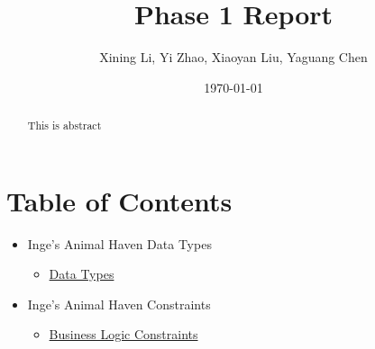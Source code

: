 \documentclass[a4paper]{article}
\begin{document}
\title{\textbf{\huge{Phase 1 Report}}}
\author{\textbf\large{Xining Li, Yi Zhao, Xiaoyan Liu, Yaguang Chen}}
\date{\today}
\maketitle
\begin{abstract}
This is abstract
\end{abstract}\maketitle
\section{Table of Contents}

\begin{itemize}
	\item Inge's Animal Haven Data Types
	\begin{itemize}
		\item \hyperlink{data_types}{Data Types}
	\end{itemize}
\end{itemize}

\begin{itemize}
	\item Inge's Animal Haven Constraints
	\begin{itemize}
		\item \hyperlink{business_logic_cons}{Business Logic Constraints}
	\end{itemize}
\end{itemize}
\end{document}
